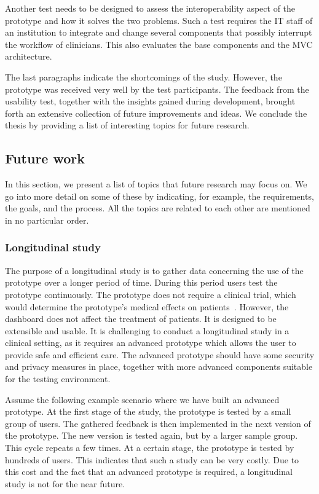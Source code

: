     Another test needs to be designed to assess the interoperability aspect of the prototype and how it solves the two problems. Such a test requires the IT staff of an institution to integrate and change several components that possibly interrupt the workflow of clinicians. This also evaluates the base components and the MVC architecture.

    The last paragraphs indicate the shortcomings of the study. However, the prototype was received very well by the test participants. The feedback from the usability test, together with the insights gained during development, brought forth an extensive collection of future improvements and ideas. We conclude the thesis by providing a list of interesting topics for future research.

    \subsection{Future work}\label{future_work}

    In this section, we present a list of topics that future research may focus on. We go into more detail on some of these by indicating, for example, the requirements, the goals, and the process. All the topics are related to each other are mentioned in no particular order.
 
    \subsubsection{Longitudinal study}

    The purpose of a longitudinal study is to gather data concerning the use of the prototype over a longer period of time. During this period users test the prototype continuously. The prototype does not require a clinical trial, which would determine the prototype's medical effects on patients~\cite{Minneci2018}. However, the dashboard does not affect the treatment of patients. It is designed to be extensible and usable. It is challenging to conduct a longitudinal study in a clinical setting, as it requires an advanced prototype which allows the user to provide safe and efficient care. The advanced prototype should have some security and privacy measures in place, together with more advanced components suitable for the testing environment.
    
    Assume the following example scenario where we have built an advanced prototype. At the first stage of the study, the prototype is tested by a small group of users. The gathered feedback is then implemented in the next version of the prototype. The new version is tested again, but by a larger sample group. This cycle repeats a few times. At a certain stage, the prototype is tested by hundreds of users. This indicates that such a study can be very costly. Due to this cost and the fact that an advanced prototype is required, a longitudinal study is not for the near future. 

